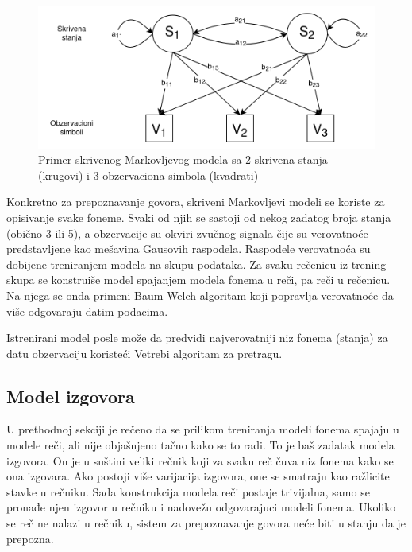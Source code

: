 \documentclass[a4paper]{article}
\begin{document}
\begin{figure}[h!]
  \begin{center}
    \includegraphics[scale=0.3]{hmm.png}
  \end{center}
  \caption{Primer skrivenog Markovljevog modela sa 2 skrivena stanja (krugovi) i 3 obzervaciona simbola (kvadrati)}
  \label{fig:hmm}
\end{figure}

Konkretno za prepoznavanje govora, skriveni Markovljevi modeli se koriste za opisivanje svake foneme.
Svaki od njih se sastoji od nekog zadatog broja stanja (obično 3 ili 5), a obzervacije su okviri zvučnog signala čije su verovatnoće predstavljene kao mešavina Gausovih raspodela.
Raspodele verovatnoća su dobijene treniranjem modela na skupu podataka.
Za svaku rečenicu iz trening skupa se konstruiše model spajanjem modela fonema u reči, pa reči u rečenicu.
Na njega se onda primeni Baum-Welch algoritam koji popravlja verovatnoće da više odgovaraju datim podacima.

Istrenirani model posle može da predvidi najverovatniji niz fonema (stanja) za datu obzervaciju koristeći Vetrebi algoritam za pretragu.

\subsection{Model izgovora}
U prethodnoj sekciji je rečeno da se prilikom treniranja modeli fonema spajaju u modele reči, ali nije objašnjeno tačno kako se to radi.
To je baš zadatak modela izgovora.
On je u suštini veliki rečnik koji za svaku reč čuva niz fonema kako se ona izgovara.
Ako postoji više varijacija izgovora, one se smatraju kao ražlicite stavke u rečniku.
Sada konstrukcija modela reči postaje trivijalna, samo se pronađe njen izgovor u rečniku i nadovežu odgovarajuci modeli fonema.
Ukoliko se reč ne nalazi u rečniku, sistem za prepoznavanje govora neće biti u stanju da je prepozna.
\end{document}
